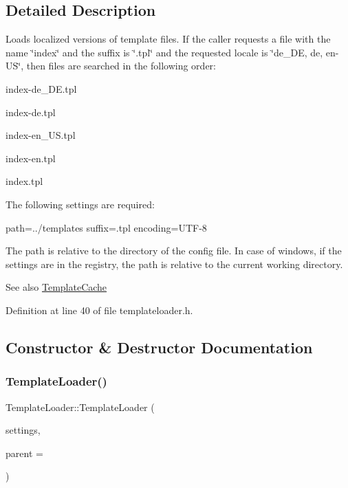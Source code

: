 \subsection{Detailed Description}
Loads localized versions of template files. If the caller requests a file with the name \char`\"{}index\char`\"{} and the suffix is \char`\"{}.\+tpl\char`\"{} and the requested locale is \char`\"{}de\+\_\+\+D\+E, de, en-\/\+U\+S\char`\"{}, then files are searched in the following order\+:


\begin{DoxyItemize}
\item index-\/de\+\_\+\+D\+E.\+tpl
\item index-\/de.\+tpl
\item index-\/en\+\_\+\+U\+S.\+tpl
\item index-\/en.\+tpl
\item index.\+tpl
\end{DoxyItemize}

The following settings are required\+: {\ttfamily 
\begin{DoxyPre}
path=../templates
suffix=.tpl
encoding=UTF-8
\end{DoxyPre}
} The path is relative to the directory of the config file. In case of windows, if the settings are in the registry, the path is relative to the current working directory. \begin{DoxySeeAlso}{See also}
\mbox{\hyperlink{classstefanfrings_1_1_template_cache}{Template\+Cache}} 
\end{DoxySeeAlso}


Definition at line 40 of file templateloader.\+h.



\subsection{Constructor \& Destructor Documentation}
\mbox{\label{classstefanfrings_1_1_template_loader_a826a8afe9a89d7635183320f3891e66f}} 
\subsubsection{\texorpdfstring{Template\+Loader()}{TemplateLoader()}}
{\footnotesize\ttfamily Template\+Loader\+::\+Template\+Loader (\begin{DoxyParamCaption}\item[{Q\+Settings $\ast$}]{settings,  }\item[{Q\+Object $\ast$}]{parent = {} }\end{DoxyParamCaption})}


